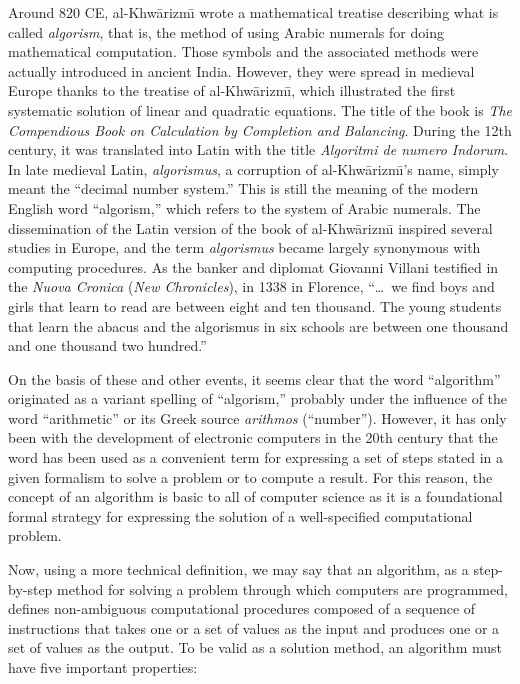 Around 820 CE, al-Khw\={a}rizm\={\i} wrote a mathematical treatise describing what is called \textit{algorism}, that is, the method of using Arabic numerals for doing mathematical computation. Those symbols and the associated methods were actually introduced in ancient India. However, they were spread in medieval Europe thanks to the treatise of al-Khw\={a}rizm\={\i}, which illustrated the first systematic solution of linear and quadratic equations. The title of the book is \textit{The Compendious Book on Calculation by Completion and Balancing}. During the 12th century, it was translated into Latin with the title \textit{Algoritmi de numero Indorum}. In late medieval Latin, \textit{algorismus}, a corruption of al-Khw\={a}rizm\={\i}'s name, simply meant the ``decimal number system.'' This is still the meaning of the modern English word ``algorism,'' which refers to the system of Arabic numerals. The dissemination of the Latin version of the book of al-Khw\={a}rizm\={\i} inspired several studies in Europe, and the term \textit{algorismus} became largely synonymous with computing procedures. As the banker and diplomat Giovanni Villani testified in the \textit{Nuova Cronica }(\textit{New Chronicles}), in 1338 in Florence, ``\ldots~we find boys and girls that learn to read are between eight and ten thousand. The young students that learn the abacus and the algorismus in six schools are between one thousand and one thousand two hundred.''


On the basis of these and other events, it seems clear that the word ``algorithm'' originated as a variant spelling of ``algorism,'' probably under the influence\vadjust{\vspace*{-6pt}\pagebreak} of the word ``arithmetic'' or its Greek source \textit{arithmos }(``number''). However, it has only been with the development of electronic computers in the 20th century that the word has been used as a convenient term for expressing a set of steps stated in a given formalism to solve a problem or to compute a result. For this reason, the concept of an algorithm is basic to all of computer science as it is a foundational formal strategy for expressing the solution of a well-specified computational problem.

Now, using a more technical definition, we may say that an algorithm, as a step-by-step method for solving a problem through which computers are programmed, defines non-ambiguous computational procedures composed of a sequence of instructions that takes one or a set of values as the input and produces one or a set of values as the output. To be valid as a solution method, an algorithm must have five important properties:

